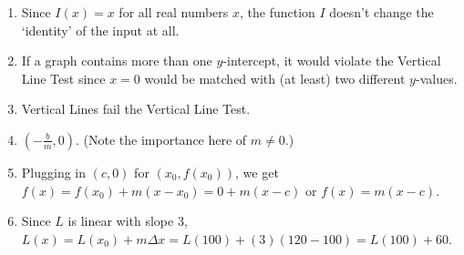 \documentclass{ximera}
\begin{document}
\begin{enumerate}
\setcounter{enumi}{\value{HW}}

\item  Since $I(x) = x$ for all real numbers $x$, the function $I$ doesn't change the `identity' of the input at all.


\item If a graph contains more than one $y$-intercept, it would violate the Vertical Line Test since $x=0$ would be matched with (at least) two different $y$-values.

\item  Vertical Lines fail the Vertical Line Test.

\item  $\left(- \frac{b}{m}, 0 \right)$.  (Note the importance here of $m \neq 0$.)

\item Plugging in $(c,0)$ for $(x_{0}, f(x_{0}))$, we get $f(x) = f(x_{0}) + m (x - x_{0}) = 0 + m(x-c)$ or $f(x) = m(x-c)$.

\item Since $L$ is linear with slope $3$, $L(x) = L(x_{0}) + m \Delta x = L(100) + (3)(120-100) = L(100)+60$.

\setcounter{HW}{\value{enumi}}
\end{enumerate}
\end{document}
